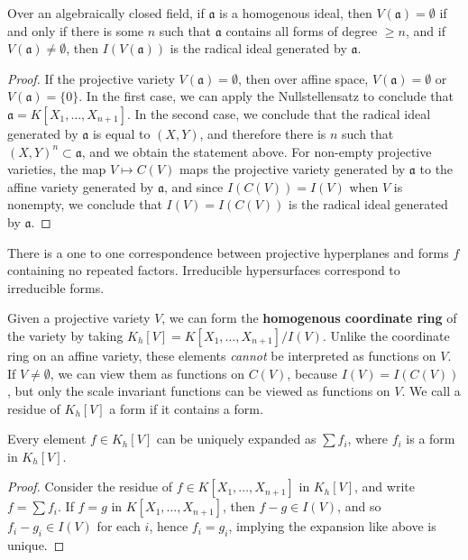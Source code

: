 \begin{theorem}
    Over an algebraically closed field, if $\mathfrak{a}$ is a homogenous ideal, then $V(\mathfrak{a}) = \emptyset$ if and only if there is some $n$ such that $\mathfrak{a}$ contains all forms of degree $\geq n$, and if $V(\mathfrak{a}) \neq \emptyset$, then $I(V(\mathfrak{a}))$ is the radical ideal generated by $\mathfrak{a}$.
\end{theorem}
\begin{proof}
    If the projective variety $V(\mathfrak{a}) = \emptyset$, then over affine space, $V(\mathfrak{a}) = \emptyset$ or $V(\mathfrak{a}) = \{ 0 \}$. In the first case, we can apply the Nullstellensatz to conclude that $\mathfrak{a} = K[X_1, \dots, X_{n+1}]$. In the second case, we conclude that the radical ideal generated by $\mathfrak{a}$ is equal to $(X,Y)$, and therefore there is $n$ such that $(X,Y)^n \subset \mathfrak{a}$, and we obtain the statement above. For non-empty projective varieties, the map $V \mapsto C(V)$ maps the projective variety generated by $\mathfrak{a}$ to the affine variety generated by $\mathfrak{a}$, and since $I(C(V)) = I(V)$ when $V$ is nonempty, we conclude that $I(V) = I(C(V))$ is the radical ideal generated by $\mathfrak{a}$.
\end{proof}

\begin{corollary}
    There is a one to one correspondence between projective hyperplanes and forms $f$ containing no repeated factors. Irreducible hypersurfaces correspond to irreducible forms.
\end{corollary}

Given a projective variety $V$, we can form the {\bf homogenous coordinate ring} of the variety by taking $K_h[V] = K[X_1, \dots, X_{n+1}]/I(V)$. Unlike the coordinate ring on an affine variety, these elements {\it cannot} be interpreted as functions on $V$. If $V \neq \emptyset$, we can view them as functions on $C(V)$, because $I(V) = I(C(V))$, but only the scale invariant functions can be viewed as functions on $V$. We call a residue of $K_h[V]$ a form if it contains a form.

\begin{prop}
    Every element $f \in K_h[V]$ can be uniquely expanded as $\sum f_i$, where $f_i$ is a form in $K_h[V]$.
\end{prop}
\begin{proof}
    Consider the residue of $f \in K[X_1, \dots, X_{n+1}]$ in $K_h[V]$, and write $f = \sum f_i$. If $f = g$ in $K[X_1, \dots, X_{n+1}]$, then $f - g \in I(V)$, and so $f_i - g_i \in I(V)$ for each $i$, hence $f_i = g_i$, implying the expansion like above is unique.
\end{proof}

